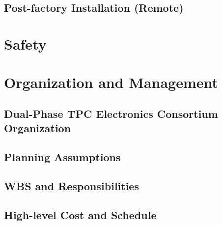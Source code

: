 \subsection{Post-factory Installation (Remote)}
\label{sec:fddp-tpc-elec-qc-remote}





\section{Safety}
\label{sec:fddp-tpc-elec-safety}






\section{Organization and Management}
\label{sec:fddp-tpc-elec-org}

\subsection{Dual-Phase TPC Electronics Consortium Organization}
\label{sec:fddp-tpc-elec-org-consortium}


\subsection{Planning Assumptions}
\label{sec:fddp-tpc-elec-org-assmp}


\subsection{WBS and Responsibilities}
\label{sec:fddp-tpc-elec-org-wbs}

\subsection{High-level Cost and Schedule}
\label{sec:fddp-tpc-elec-org-cs}














